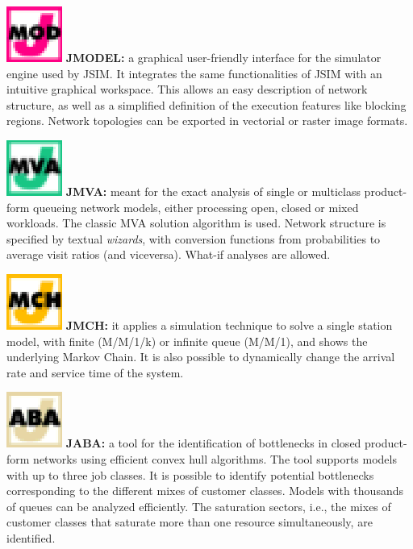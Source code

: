 \medskip \noindent \includegraphics[scale=.5]{img/JMODELIcon}
\textbf{JMODEL:} a graphical user-friendly interface for the simulator
engine used by JSIM. It integrates the same functionalities of JSIM
with an intuitive graphical workspace. This allows an easy
description of network structure, as well as a simplified definition
of the execution features like blocking regions. Network topologies
can be exported in vectorial or raster image formats.

\medskip \noindent \includegraphics[scale=.5]{img/JMVAIcon}
\textbf{JMVA:} meant for the exact analysis of single or multiclass
product-form queueing network models, either processing open, closed
or mixed workloads. The classic MVA solution algorithm is used.
Network structure is specified by textual \emph{wizards}, with
conversion functions from probabilities to average visit ratios (and
viceversa). What-if analyses are allowed.

\medskip \noindent \includegraphics[scale=.5]{img/JMCHIcon}
\textbf{JMCH:} it applies a simulation technique to solve a single
station model, with finite (M/M/1/k) or infinite queue (M/M/1), and
shows the underlying Markov Chain. It is also possible to
dynamically change the arrival rate and service time of the system.

\medskip \noindent \includegraphics[scale=.5]{img/JABAIcon}
\textbf{JABA:} a tool for the identification of bottlenecks in closed
product-form networks using efficient convex hull algorithms. The
tool supports models with up to three job classes. It is possible to
identify potential bottlenecks corresponding to the different mixes
of customer classes. Models with thousands of queues can be analyzed
efficiently. The saturation sectors, i.e., the mixes of customer
classes that saturate more than one resource simultaneously, are
identified.


